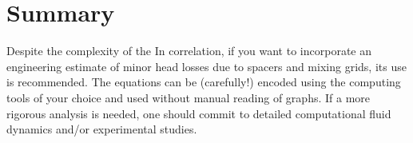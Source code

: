 \section{Summary}

Despite the complexity of the In correlation, if you want to incorporate an engineering estimate of minor head losses due to spacers and mixing grids, its use is recommended.  The equations can be (carefully!) encoded using the computing tools of your choice and used without manual reading of graphs.  If a more rigorous analysis is needed, one should commit to detailed computational fluid dynamics and/or experimental studies.

